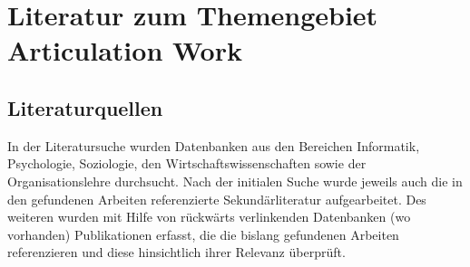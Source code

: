 
\chapter{Literatur zum Themengebiet Articulation Work} %
\label{cha:literatur_zum_themengebiet_articulation_work}

\section{Literaturquellen} %
\label{sec:literaturquellen}

In der Literatursuche wurden Datenbanken aus den Bereichen Informatik, Psychologie, Soziologie, den Wirtschaftswissenschaften sowie der Organisationslehre durchsucht. Nach der initialen Suche wurde jeweils auch die in den gefundenen Arbeiten referenzierte Sekundärliteratur aufgearbeitet. Des weiteren wurden mit Hilfe von rückwärts verlinkenden Datenbanken (wo vorhanden) Publikationen erfasst, die die bislang gefundenen Arbeiten referenzieren und diese hinsichtlich ihrer Relevanz überprüft.

